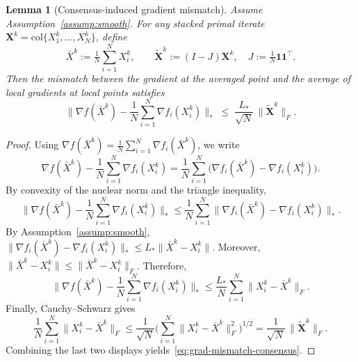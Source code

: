 \documentclass{article}
\newtheorem{lemma}{Lemma}
\begin{document}
\begin{lemma}[Consensus-induced gradient mismatch]
\label{lem:sudamuon-grad-mismatch-consensus}
Assume Assumption~\ref{assump:smooth}.
For any stacked primal iterate $\mathbf{X}^k=\mathrm{col}\{X_1^k,\dots,X_N^k\}$, define
\[
\bar X^k:=\tfrac{1}{N}\sum_{i=1}^N X_i^k,\qquad
\tilde{\mathbf X}^k := (I-J)\mathbf X^k,\quad J:=\tfrac{1}{N}\mathbf 1\mathbf 1^\top.
\]
Then the mismatch between the gradient at the averaged point and the average of local gradients at local points satisfies
\begin{equation}
\label{eq:grad-mismatch-consensus}
\Big\|\nabla f(\bar X^k)-\frac{1}{N}\sum_{i=1}^N \nabla f_i(X_i^k)\Big\|_*
\;\le\; \frac{L_*}{\sqrt N}\,\|\tilde{\mathbf X}^k\|_F.
\end{equation}
\end{lemma}
\begin{proof}
Using $\nabla f(\bar X^k)=\tfrac{1}{N}\sum_{i=1}^N \nabla f_i(\bar X^k)$, we write
\[
\nabla f(\bar X^k)-\frac{1}{N}\sum_{i=1}^N \nabla f_i(X_i^k)
=\frac{1}{N}\sum_{i=1}^N \bigl(\nabla f_i(\bar X^k)-\nabla f_i(X_i^k)\bigr).
\]
By convexity of the nuclear norm and the triangle inequality,
\[
\Big\|\nabla f(\bar X^k)-\frac{1}{N}\sum_{i=1}^N \nabla f_i(X_i^k)\Big\|_*
\le \frac{1}{N}\sum_{i=1}^N \|\nabla f_i(\bar X^k)-\nabla f_i(X_i^k)\|_*.
\]
By Assumption~\ref{assump:smooth}, $\|\nabla f_i(\bar X^k)-\nabla f_i(X_i^k)\|_*\le L_*\|\bar X^k-X_i^k\|$.
Moreover, $\|\bar X^k-X_i^k\|\le \|\bar X^k-X_i^k\|_F$.
Therefore,
\[
\Big\|\nabla f(\bar X^k)-\frac{1}{N}\sum_{i=1}^N \nabla f_i(X_i^k)\Big\|_*
\le \frac{L_*}{N}\sum_{i=1}^N \|X_i^k-\bar X^k\|_F.
\]
Finally, Cauchy--Schwarz gives
\[
\frac{1}{N}\sum_{i=1}^N \|X_i^k-\bar X^k\|_F
\le \frac{1}{\sqrt N}\Big(\sum_{i=1}^N \|X_i^k-\bar X^k\|_F^2\Big)^{1/2}
=\frac{1}{\sqrt N}\,\|\tilde{\mathbf X}^k\|_F.
\]
Combining the last two displays yields~\eqref{eq:grad-mismatch-consensus}.
\end{proof}
\end{document}
